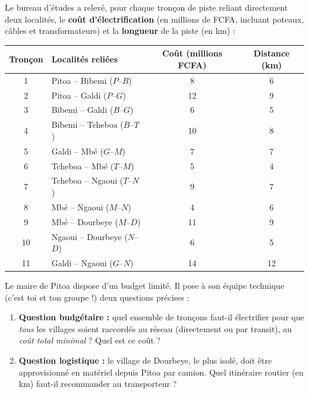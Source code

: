 \documentclass[11pt]{article}
\newcounter{popsec}
\newcounter{popsub}
\newcommand{\courssub}[1]{%
  \stepcounter{popsub}%
  \par\vspace{9pt}\noindent{\popxbold\fontsize{11.5}{13}\selectfont\color{popink}{\color{poporange}\thepopsec.\thepopsub}\hspace{6pt}#1}\par\nopagebreak\vspace{4pt}
}
\begin{document}
Le bureau d'études a relevé, pour chaque tronçon de piste reliant directement deux localités, le \textbf{coût d'électrification} (en millions de FCFA, incluant poteaux, câbles et transformateurs) et la \textbf{longueur} de la piste (en km) :

\begin{center}
\begin{tabularx}{\linewidth}{|c|X|c|c|}
\hline
\rowcolor{popblueL} \textbf{Tronçon} & \textbf{Localités reliées} & \textbf{Coût (millions FCFA)} & \textbf{Distance (km)} \\
\hline
1 & Pitoa -- Bibemi ($P$--$B$) & 8 & 6 \\
\hline
2 & Pitoa -- Galdi ($P$--$G$) & 12 & 9 \\
\hline
3 & Bibemi -- Galdi ($B$--$G$) & 6 & 5 \\
\hline
4 & Bibemi -- Tcheboa ($B$--$T$) & 10 & 8 \\
\hline
5 & Galdi -- Mbé ($G$--$M$) & 7 & 7 \\
\hline
6 & Tcheboa -- Mbé ($T$--$M$) & 5 & 4 \\
\hline
7 & Tcheboa -- Ngaoui ($T$--$N$) & 9 & 7 \\
\hline
8 & Mbé -- Ngaoui ($M$--$N$) & 4 & 6 \\
\hline
9 & Mbé -- Dourbeye ($M$--$D$) & 11 & 9 \\
\hline
10 & Ngaoui -- Dourbeye ($N$--$D$) & 6 & 5 \\
\hline
11 & Galdi -- Ngaoui ($G$--$N$) & 14 & 12 \\
\hline
\end{tabularx}
\end{center}

Le maire de Pitoa dispose d'un budget limité. Il pose à son équipe technique (c'est toi et ton groupe !) deux questions précises :

\begin{enumerate}
\item \textbf{Question budgétaire :} quel ensemble de tronçons faut-il électrifier pour que \emph{tous} les villages soient raccordés au réseau (directement ou par transit), au \emph{coût total minimal} ? Quel est ce coût ?
\item \textbf{Question logistique :} le village de Dourbeye, le plus isolé, doit être approvisionné en matériel depuis Pitoa par camion. Quel itinéraire routier (en km) faut-il recommander au transporteur ?
\end{enumerate}

\courssub{Consignes}
\end{document}

